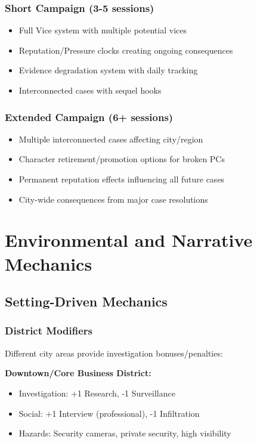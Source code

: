 \documentclass[11pt]{article}
\begin{document}
\subsubsection{Short Campaign (3-5 sessions)}

\begin{itemize}
\item Full Vice system with multiple potential vices
\item Reputation/Pressure clocks creating ongoing consequences
\item Evidence degradation system with daily tracking
\item Interconnected cases with sequel hooks
\end{itemize}

\subsubsection{Extended Campaign (6+ sessions)}

\begin{itemize}
\item Multiple interconnected cases affecting city/region
\item Character retirement/promotion options for broken PCs
\item Permanent reputation effects influencing all future cases
\item City-wide consequences from major case resolutions
\end{itemize}

\section{Environmental and Narrative Mechanics}

\subsection{Setting-Driven Mechanics}

\subsubsection{District Modifiers}

Different city areas provide investigation bonuses/penalties:

\textbf{Downtown/Core Business District:}
\begin{itemize}
\item Investigation: +1 Research, -1 Surveillance
\item Social: +1 Interview (professional), -1 Infiltration
\item Hazards: Security cameras, private security, high visibility
\end{itemize}
\end{document}
